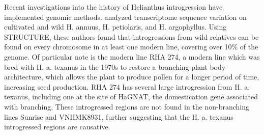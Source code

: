 \documentclass[11pt]{article}
\begin{document}
\begin{enumerate}
\begin{enumerate}
Recent investigations into the history of Helianthus introgression have implemented genomic methods.
\cite{Baute2015} analyzed transcriptome sequence variation on cultivated and wild H. annuus, H. petiolaris, and H. argophyllus.
Using STRUCTURE, these authors found that introgressions from wild relatives can be found on every chromosome in at least one modern line, covering over 10\% of the genome.
Of particular note is the modern line RHA 274, a modern line which was bred with H. a. texanus in the 1970s to restore a branching plant body architecture, which allows the plant to produce pollen for a longer period of time, increasing seed production.
RHA 274 has several large introgression from H. a. texanus, including one at the site of HaGNAT, the domestication gene associated with branching.
These introgressed regions are not found in the non-branching lines Sunrise and VNIIMK8931, further suggesting that the H. a. texanus introgressed regions are causative.












































\end{enumerate}
\end{enumerate}
\end{document}
